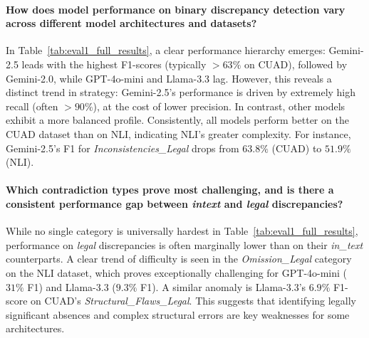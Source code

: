 \documentclass[11pt]{article}
\begin{document}
\paragraph{How does model performance on binary discrepancy detection vary across different model architectures and datasets?}
In Table~\ref{tab:eval1_full_results}, a clear performance hierarchy emerges: Gemini-2.5 leads with the highest F1-scores (typically $>63\%$ on CUAD), followed by Gemini-2.0, while GPT-4o-mini and Llama-3.3 lag. However, this reveals a distinct trend in strategy: Gemini-2.5's performance is driven by extremely high recall (often $>90\%$), at the cost of lower precision. In contrast, other models exhibit a more balanced profile. Consistently, all models perform better on the CUAD dataset than on NLI, indicating NLI's greater complexity. For instance, Gemini-2.5's F1 for \textit{Inconsistencies\_Legal} drops from $63.8\%$ (CUAD) to $51.9\%$ (NLI).

\paragraph{Which contradiction types prove most challenging, and is there a consistent performance gap between \textit{intext} and \textit{legal} discrepancies?}
While no single category is universally hardest in Table~\ref{tab:eval1_full_results}, performance on \textit{legal} discrepancies is often marginally lower than on their \textit{in\_text} counterparts. A clear trend of difficulty is seen in the \textit{Omission\_Legal} category on the NLI dataset, which proves exceptionally challenging for GPT-4o-mini ($31\%$ F1) and Llama-3.3 ($9.3\%$ F1). A similar anomaly is Llama-3.3's $6.9\%$ F1-score on CUAD's \textit{Structural\_Flaws\_Legal}. This suggests that identifying legally significant absences and complex structural errors are key weaknesses for some architectures.
\end{document}
